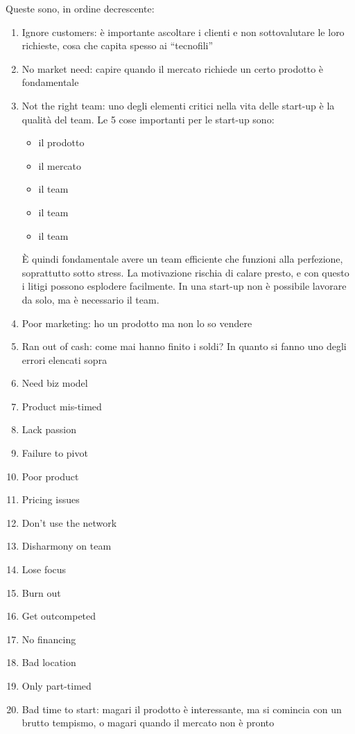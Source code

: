 Queste sono, in ordine decrescente:
\begin{enumerate}
 \item Ignore customers: è importante ascoltare i clienti e non sottovalutare
le loro richieste, cosa che capita spesso ai ``tecnofili''
 \item No market need: capire quando il mercato richiede un certo prodotto è
fondamentale
 \item Not the right team: uno degli elementi critici nella vita delle
start-up è la qualità del team. Le 5 cose importanti per le start-up sono:
\begin{itemize}
 \item il prodotto
 \item il mercato
 \item il team
 \item il team
 \item il team
\end{itemize}
  È quindi fondamentale avere un team efficiente che funzioni alla perfezione,
soprattutto sotto stress. La motivazione rischia di calare presto, e con questo
i litigi possono esplodere facilmente. In una start-up non è possibile lavorare
da solo, ma è necessario il team.
 \item Poor marketing: ho un prodotto ma non lo so vendere
 \item Ran out of cash: come mai hanno finito i soldi? In quanto si fanno uno
degli errori elencati sopra
 \item Need biz model
 \item Product mis-timed
 \item Lack passion
 \item Failure to pivot
 \item Poor product
 \item Pricing issues
 \item Don't use the network
 \item Disharmony on team
 \item Lose focus
 \item Burn out
 \item Get outcompeted
 \item No financing
 \item Bad location
 \item Only part-timed
 \item Bad time to start: magari il prodotto è interessante, ma si comincia con
un brutto tempismo, o magari quando il mercato non è pronto
\end{enumerate}

